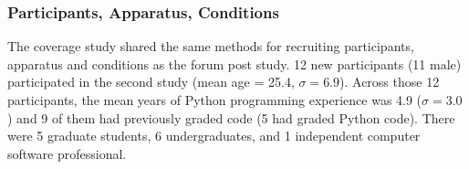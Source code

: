 \documentclass[12pt,twoside]{mitthesis}
\providecommand{\DIFaddbegin}{} %
\providecommand{\DIFaddend}{} %
\providecommand{\DIFdelbegin}{} %
\providecommand{\DIFdelend}{} %
\begin{document}
\DIFdelbegin %
\DIFdelend \DIFaddbegin \subsubsection{Participants, Apparatus, Conditions}
\DIFaddend 

\DIFdelbegin %

\DIFdelend The coverage study shared the same methods for recruiting participants, apparatus and conditions as the forum post study. 12 new participants (11 male) participated in the second study (mean age = 25.4, $\sigma = 6.9$). Across those 12 participants, the mean years of Python programming experience was 4.9 ($\sigma = 3.0$) and 9 of them had previously graded code (5 had graded Python code). There were 5 graduate students, 6 undergraduates, and 1 independent computer software professional.
\end{document}

